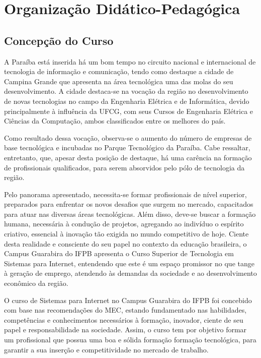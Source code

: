\newpage
\section{Organiza\c{c}\~ao Did\'atico-Pedag\'ogica}

\subsection{Concep\c{c}\~ao do Curso}

A Paraíba está inserida há um bom tempo no circuito nacional e internacional de tecnologia de informação e comunicação, tendo como destaque a cidade de Campina Grande que apresenta na área tecnológica uma das molas do seu desenvolvimento. A cidade destaca-se na vocação da região no desenvolvimento de novas tecnologias no campo da Engenharia Elétrica e de Informática, devido principalmente à influência da UFCG, com seus Cursos de Engenharia Elétrica e Ciências da Computação, ambos classificados entre os melhores do país.

Como resultado dessa vocação, observa-se o aumento do número de empresas de base tecnológica e incubadas no Parque Tecnológico da Paraíba. Cabe ressaltar, entretanto, que, apesar desta posição de destaque, há uma carência na formação de profissionais qualificados, para serem absorvidos pelo pólo de tecnologia da região.

Pelo panorama apresentado, necessita-se formar profissionais de nível superior, preparados para enfrentar os novos desafios que surgem no mercado, capacitados para atuar nas diversas áreas tecnológicas. Além disso, deve-se buscar a formação humana, necessária à condução de projetos, agregando ao indivíduo o espírito criativo, essencial à inovação tão exigida no mundo competitivo de hoje. Ciente desta realidade e consciente do seu papel no contexto da educação brasileira, o Campus Guarabira do IFPB apresenta o Curso Superior de Tecnologia em Sistemas para Internet, entendendo que este é um espaço promissor no que tange à geração de emprego, atendendo às demandas da sociedade e ao desenvolvimento econômico da região.

O curso de Sistemas para Internet no Campus Guarabira do IFPB foi concebido com base nas recomendações do MEC, estando fundamentado nas habilidades, competências e conhecimentos necessários à formação, inovador, ciente de seu papel e responsabilidade na sociedade. Assim, o curso tem por objetivo formar um profissional que possua uma boa e sólida formação formação tecnológica, para garantir a sua inserção e competitividade no mercado de trabalho.

